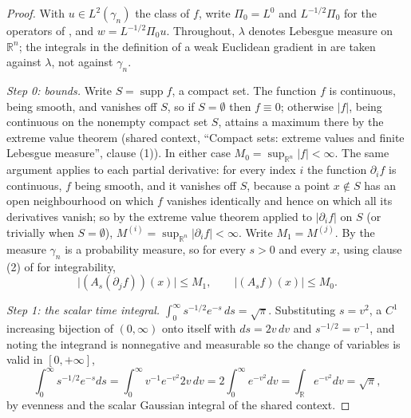 \begin{proof}
With $u \in L^2(\gamma_n)$ the class of $f$, write $\Pi_0 = L^0$ and
$L^{-1/2}\Pi_0$ for the operators of , and
$w = L^{-1/2}\Pi_0 u$.  Throughout, $\lambda$ denotes Lebesgue measure on
$\mathbb{R}^n$; the integrals in the definition of a weak Euclidean gradient in
 are taken against $\lambda$, not against $\gamma_n$.

\emph{Step 0: bounds.}
Write $S = \operatorname{supp} f$, a compact set.  The function $f$ is
continuous, being smooth, and vanishes off $S$, so if $S = \emptyset$ then
$f \equiv 0$; otherwise $|f|$, being continuous on the nonempty compact set
$S$, attains a maximum there by the extreme value theorem (shared context,
``Compact sets: extreme values and finite Lebesgue measure'', clause (1)).  In
either case $M_0 = \sup_{\mathbb{R}^n}|f| < \infty$.  The same argument applies
to each partial derivative: for every index $i$ the function $\partial_i f$ is
continuous, $f$ being smooth, and it vanishes off $S$, because a point
$x \notin S$ has an open neighbourhood on which $f$ vanishes identically and
hence on which all its derivatives vanish; so by the extreme value theorem
applied to $|\partial_i f|$ on $S$ (or trivially when $S = \emptyset$),
$M^{(i)} = \sup_{\mathbb{R}^n}|\partial_i f| < \infty$.  Write $M_1 = M^{(j)}$.  By
 the measure $\gamma_n$ is a probability measure, so for
every $s>0$ and every $x$, using clause (2) of 
for integrability,
\begin{equation*}
  \bigl|(A_s(\partial_j f))(x)\bigr| \leq M_1 ,
  \qquad
  \bigl|(A_s f)(x)\bigr| \leq M_0 . \tag{0}
\end{equation*}

\emph{Step 1: the scalar time integral.}
$\int_0^\infty s^{-1/2}e^{-s}\,ds = \sqrt\pi$.  Substituting $s = v^2$, a $C^1$
increasing bijection of $(0,\infty)$ onto itself with $ds = 2v\,dv$ and
$s^{-1/2} = v^{-1}$, and noting the integrand is nonnegative and measurable so
the change of variables is valid in $[0,+\infty]$,
\[
  \int_0^\infty s^{-1/2}e^{-s}ds = \int_0^\infty v^{-1}e^{-v^2}2v\,dv
    = 2\int_0^\infty e^{-v^2}dv = \int_{\mathbb{R}}e^{-v^2}dv = \sqrt\pi ,
\]
by evenness and the scalar Gaussian integral of the shared context.


\end{proof}
